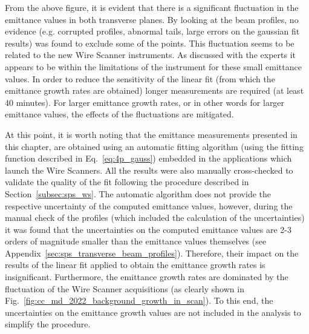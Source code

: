 
From the above figure, it is evident that there is a significant fluctuation in the emittance values in both transverse planes. By looking at the beam profiles, no evidence (e.g. corrupted profiles, abnormal tails, large errors on the gaussian fit results) was found to exclude some of the points. This fluctuation seems to be related to the new Wire Scanner instruments. As discussed with the experts it appears to be within the limitations of the instrument for these small emittance values. In order to reduce the sensitivity of the linear fit (from which the emittance growth rates are obtained) longer measurements are required (at least 40 minutes). For larger emittance growth rates, or in other words for larger emittance values, the effects of the fluctuations are mitigated.


At this point, it is worth noting that the emittance measurements presented in this chapter, are obtained using an automatic fitting algorithm (using the fitting function described in Eq.~\eqref{eq:4p_gauss}) embedded in the applications which launch the Wire Scanners. All the results were also manually cross-checked to validate the quality of the fit following the procedure described in Section~\ref{subsec:sps_ws}. The automatic algorithm does not provide the respective uncertainty of the computed emittance values, however, during the manual check of the profiles (which included the calculation of the uncertainties) it was found that the uncertainties on the computed emittance values are 2-3 orders of magnitude smaller than the emittance values themselves (see Appendix~\ref{sec:sps_transverse_beam_profiles}). Therefore, their impact on the results of the linear fit applied to obtain the emittance growth rates is insignificant. Furthermore, the emittance growth rates are dominated by the fluctuation of the Wire Scanner acquisitions (as clearly shown in Fig.~\ref{fig:cc_md_2022_background_growth_in_scan}). To this end, the uncertainties on the emittance growth values are not included in the analysis to simplify the procedure.


